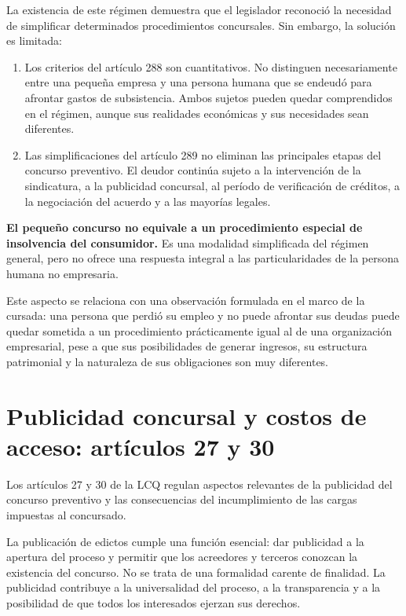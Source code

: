 \documentclass[12pt,oneside]{book}
\begin{document}
La existencia de este régimen demuestra que el legislador reconoció la necesidad de simplificar determinados procedimientos concursales. Sin embargo, la solución es limitada:
\begin{enumerate}
    \item Los criterios del artículo 288 son cuantitativos. No distinguen necesariamente entre una pequeña empresa y una persona humana que se endeudó para afrontar gastos de subsistencia. Ambos sujetos pueden quedar comprendidos en el régimen, aunque sus realidades económicas y sus necesidades sean diferentes.
    \item Las simplificaciones del artículo 289 no eliminan las principales etapas del concurso preventivo. El deudor continúa sujeto a la intervención de la sindicatura, a la publicidad concursal, al período de verificación de créditos, a la negociación del acuerdo y a las mayorías legales.
\end{enumerate}

\begin{important}
\textbf{El pequeño concurso no equivale a un procedimiento especial de insolvencia del consumidor.} Es una modalidad simplificada del régimen general, pero no ofrece una respuesta integral a las particularidades de la persona humana no empresaria.
\end{important}

Este aspecto se relaciona con una observación formulada en el marco de la cursada: una persona que perdió su empleo y no puede afrontar sus deudas puede quedar sometida a un procedimiento prácticamente igual al de una organización empresarial, pese a que sus posibilidades de generar ingresos, su estructura patrimonial y la naturaleza de sus obligaciones son muy diferentes.

\section{Publicidad concursal y costos de acceso: artículos 27 y 30}

Los artículos 27 y 30 de la LCQ regulan aspectos relevantes de la publicidad del concurso preventivo y las consecuencias del incumplimiento de las cargas impuestas al concursado.

La publicación de edictos cumple una función esencial: dar publicidad a la apertura del proceso y permitir que los acreedores y terceros conozcan la existencia del concurso. No se trata de una formalidad carente de finalidad. La publicidad contribuye a la universalidad del proceso, a la transparencia y a la posibilidad de que todos los interesados ejerzan sus derechos.
\end{document}

